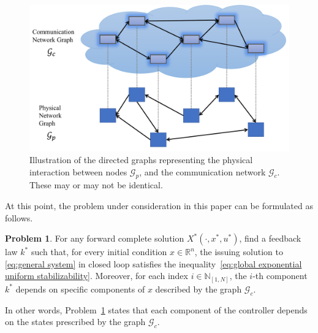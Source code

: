 \documentclass[10pt,twocolumn,twoside]{IEEEtran}
\newcounter{para}
\newcommand\mypara{\par}
\theoremstyle{plain}
\theoremstyle{definition}
\newtheorem{problem}{Problem}
\theoremstyle{remark}
\begin{document}
\begin{figure}
	\centering
	\includegraphics[width=\columnwidth]{./imgs/physical_network_graphs}
	
	\caption{Illustration of the directed graphs representing the physical interaction between nodes $\mathscr{G}_p$, and the communication network $\mathscr{G}_c$. These may or may not be identical.}
	\label{fig:graph different illustration}
\end{figure}

\mypara At this point, the problem under consideration in this paper can be formulated as follows.

\begin{problem}\label{problem formulation}
 For any forward complete solution $X^\ast(\cdot,x^\ast,u^\ast)$, find a feedback law $k^\ast$ such that, for every initial condition $x\in\mathbb{R}^n$, the issuing solution to  \eqref{eq:general system} in closed loop satisfies the inequality~\eqref{eq:global exponential uniform stabilizability}. Moreover, for each index $i\in\mathbb{N}_{[1,N]}$, the $i$-th component $k^\ast$ depends on specific components of $x$ described by the graph $\mathscr{G}_c$.
\end{problem}

\mypara In other words, Problem~\ref{problem formulation} states that each component of the controller depends on the states prescribed by the graph $\mathscr{G}_c$.
\end{document}
